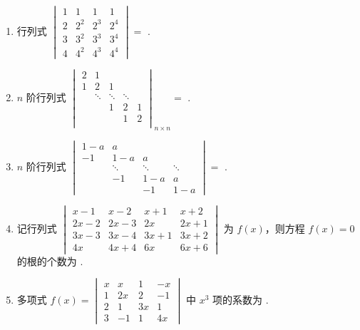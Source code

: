 \documentclass[12pt, a4paper]{ctexart}
\begin{document}
\begin{enumerate}
    \item 行列式 $ \begin{vmatrix} 1 & 1 & 1 & 1 \\ 2 & 2^{2} & 2^{3} & 2^{4} \\ 3 & 3^{2} & 3^{3} & 3^{4} \\ 4 & 4^{2} & 4^{3} & 4^{4} \end{vmatrix} = $ \underline{\hspace{2cm}}.

    \item $n$ 阶行列式 $ \begin{vmatrix} 2 & 1 \\ 1 & 2 & 1 \\ & \ddots & \ddots & \ddots \\ & & 1 & 2 & 1 \\ & & & 1 & 2 \\ \end{vmatrix}_{n\times n} = $ \underline{\hspace{2cm}}.

    \item $n$ 阶行列式 $ \begin{vmatrix} 1-a & a \\ -1 & 1-a & a \\ &\ddots & \ddots & \ddots \\ & -1 & 1-a & a \\ & & -1 & 1-a \end{vmatrix} = $ \underline{\hspace{2cm}}.

    \item 记行列式 $ \begin{vmatrix} x-1 & x-2 & x+1 & x+2 \\ 2x-2 & 2x-3 & 2x & 2x+1 \\ 3x-3 & 3x-4 & 3x+1 & 3x+2 \\ 4x & 4x+4 & 6x & 6x+6 \end{vmatrix} $ 为 $ f(x) $，则方程 $ f(x)=0 $ 的根的个数为 \underline{\hspace{2cm}}.

    \item 多项式 $ f(x)=\begin{vmatrix}x&x&1&-x\\1&2x&2&-1\\2&1&3x&1\\3&-1&1&4x\end{vmatrix} $ 中 $ x^{3} $ 项的系数为 \underline{\hspace{2cm}}.


\end{enumerate}
\end{document}
